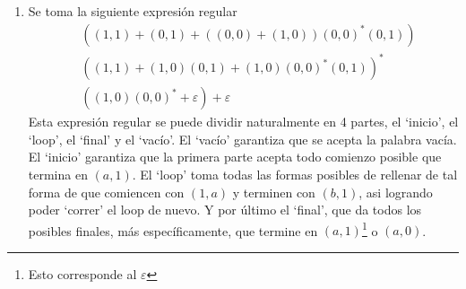\documentclass{homework}
\begin{document}
\begin{p1}
\begin{sol}
\begin{enumerate}
\begin{align*}
                +&01\\
                +&01^+00(0+1)^*\\
                +&01^+(011)^*\\
                +&01^+(011)^+10(0+1)^*\\
                +&01^+(011)^+10(0+1)^*\\
                +&01^+(011)^*00(0+1)^*
            \end{align*}
            \item Se toma la siguiente expresión regular 
            \begin{align*}
                &((1,1)+(0,1)+((0,0)+(1,0))(0,0)^*(0,1))\\
                &((1,1)+(1,0)(0,1)+(1,0)(0,0)^*(0,1))^*\\
                &((1,0)(0,0)^*+\varepsilon)+\varepsilon
            \end{align*}
            Esta expresión regular se puede dividir naturalmente en 4 partes, el `inicio', el `loop', el `final' y el `vacío'. El `vacío' garantiza que se acepta la palabra vacía. El `inicio' garantiza que la primera parte acepta todo comienzo posible que termina en \((a,1)\). El `loop' toma todas las formas posibles de rellenar de tal forma de que comiencen con \((1,a)\) y terminen con \((b,1)\), asi logrando poder `correr' el loop de nuevo. Y por último el `final', que da todos los posibles finales, más específicamente, que termine en \((a,1)\)\footnote{Esto corresponde al \(\varepsilon\)} o \((a,0)\).
        \end{enumerate}
    \end{sol}
\end{p1}
\end{document}
